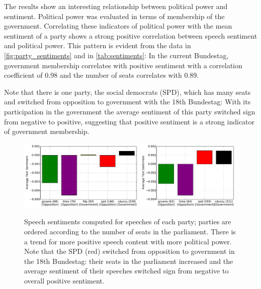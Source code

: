 \documentclass{article}
\begin{document}
The results show an interesting relationship between political power and sentiment. Political power was evaluated in terms of membership of the government. Correlating these indicators of political power with the mean sentiment of a party shows a strong positive correlation between speech sentiment and political power. This pattern is evident from the data in \autoref{fig:party_sentiments} and in \autoref{tab:sentiments}: In the current Bundestag, government membership correlates with positive sentiment with a correlation coefficient of 0.98 and the number of seats correlates with 0.89.

Note that there is one party, the social democrats (SPD), which has many seats and switched from opposition to government with the 18th Bundestag: With its participation in the government the average sentiment of this party switched sign from negative to positive, suggesting that positive sentiment is a strong indicator of government membership.


\begin{figure}
\begin{center}
\includegraphics[width=6cm]{images/party-sentiments-17.pdf}  \hfill \includegraphics[width=5cm]{images/party-sentiments-18.pdf}
%
\end{center}
\caption{
\label{fig:party_sentiments}
Speech sentiments computed for speeches of each party; parties are ordered according to the number of seats in the parliament. There is a trend for more positive speech content with more political power. Note that the SPD (red) switched from opposition to government in the 18th Bundestag: their seats in the parliament increased and the average sentiment of their speeches switched sign from negative to overall positive sentiment.
}
\end{figure}
\end{document}
